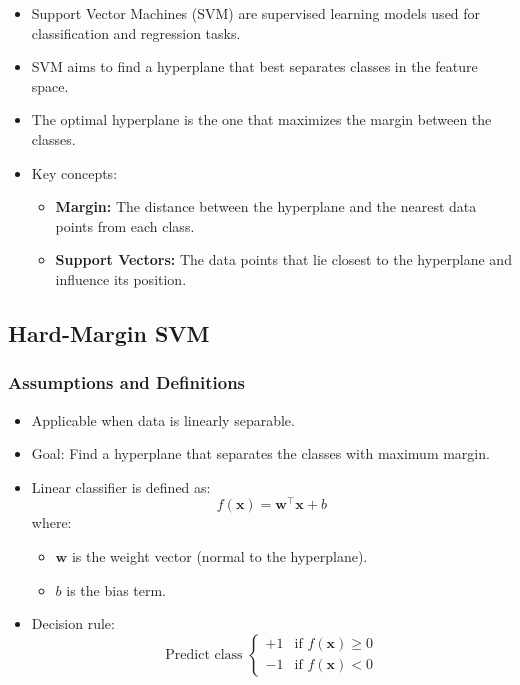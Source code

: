 \documentclass{article}
\begin{document}
\begin{itemize}
    \item Support Vector Machines (SVM) are supervised learning models used for classification and regression tasks.
    \item SVM aims to find a hyperplane that best separates classes in the feature space.
    \item The optimal hyperplane is the one that maximizes the margin between the classes.
    \item Key concepts:
    \begin{itemize}
        \item \textbf{Margin:} The distance between the hyperplane and the nearest data points from each class.
        \item \textbf{Support Vectors:} The data points that lie closest to the hyperplane and influence its position.
    \end{itemize}
\end{itemize}

\subsection{Hard-Margin SVM}

\subsubsection{Assumptions and Definitions}

\begin{itemize}
    \item Applicable when data is linearly separable.
    \item Goal: Find a hyperplane that separates the classes with maximum margin.
    \item Linear classifier is defined as:
    \[
    f(\mathbf{x}) = \mathbf{w}^\top \mathbf{x} + b
    \]
    where:
    \begin{itemize}
        \item $\mathbf{w}$ is the weight vector (normal to the hyperplane).
        \item $b$ is the bias term.
    \end{itemize}
    \item Decision rule:
    \[
    \text{Predict class } \begin{cases}
    +1 & \text{if } f(\mathbf{x}) \geq 0 \\
    -1 & \text{if } f(\mathbf{x}) < 0
    \end{cases}
    \]
\end{itemize}
\end{document}
